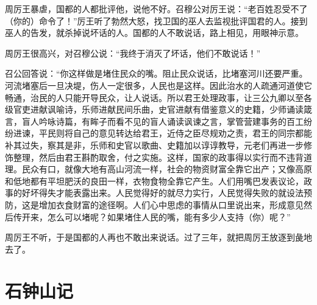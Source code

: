\documentclass[12pt,UTF-8,openany,a4]{ctexbook}
\begin{document}
\begin{large}\yiwen
    
    周厉王暴虐，国都的人都批评他，说他不好。召穆公对厉王说：“老百姓忍受不了（你的）命令了！”厉王听了勃然大怒，找卫国的巫人去监视批评国君的人。接到巫人的告发，就杀掉说坏话的人。国都的人不敢说话，路上相见，用眼神示意。
    
    周厉王很高兴，对召穆公说：“我终于消灭了坏话，他们不敢说话！”
    
    召公回答说：“你这样做是堵住民众的嘴。阻止民众说话，比堵塞河川还要严重。河流堵塞后一旦决堤，伤人一定很多，人民也是这样。因此治水的人疏通河道使它畅通，治民的人只能开导民众，让人说话。所以君王处理政事，让三公九卿以至各级官吏进献讽喻诗，乐师进献民间乐曲，史官进献有借鉴意义的史籍，少师诵读箴言，盲人吟咏诗篇，有眸子而看不见的盲人诵读讽谏之言，掌管营建事务的百工纷纷进谏，平民则将自己的意见转达给君王，近侍之臣尽规劝之责，君王的同宗都能补其过失，察其是非，乐师和史官以歌曲、史籍加以谆谆教导，元老们再进一步修饰整理，然后由君王斟酌取舍，付之实施。这样，国家的政事得以实行而不违背道理。民众有口，就像大地有高山河流一样，社会的物资财富全靠它出产；又像高原和低地都有平坦肥沃的良田一样，衣物食物全靠它产生。人们用嘴巴发表议论，政事的好坏得失才能表露出来。人民觉得好的就尽力实行，人民觉得失败的就设法预防，这是增加衣食财富的途径啊。人们心中思虑的事情从口里说出来，形成意见然后传开来，怎么可以堵呢？如果堵住人民的嘴，能有多少人支持（你）呢？”
    
    周厉王不听，于是国都的人再也不敢出来说话。过了三年，就把周厉王放逐到彘地去了。
    

\end{large}



\chapter{石钟山记}
\end{document}
